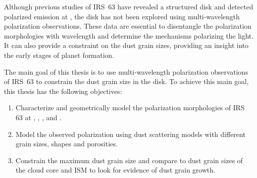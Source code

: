 



Although previous studies of IRS~63 have revealed a structured disk and detected polarized emission at \bsixNS, the disk has not been explored using multi-wavelength polarization observations. These data are essential to disentangle the polarization morphologies with wavelength and determine the mechanisms polarizing the light. It can also provide a constraint on the dust grain sizes, providing an insight into the early stages of planet formation. 


The main goal of this thesis is to use multi-wavelength polarization observations of IRS~63 to constrain the dust grain size in the disk. To achieve this main goal, this thesis has the following objectives:
\begin{enumerate}
    \item Characterize and geometrically model the polarization morphologies of IRS 63 at \bfourNS, \bfiveNS, \bsixNS, and \bsevenNS. 
    \item Model the observed polarization using dust scattering models with different grain sizes, shapes and porosities. 
    \item Constrain the maximum dust grain size and compare to dust grain sizes of the cloud core and ISM to look for evidence of dust grain growth. 
\end{enumerate}
